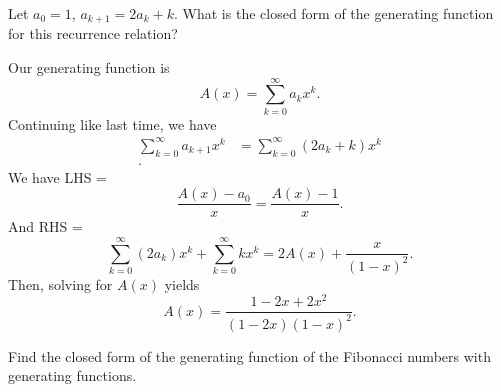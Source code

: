 \begin{eg}
	Let \( a_0=1 \), \( a_{k+1}=2a_k+k \). What is the closed form of the generating function for this recurrence relation?
\end{eg}

Our generating function is \[
	A(x) = \sum_{k=0}^{\infty}a_k x^k 
.\] Continuing like last time, we have 
\begin{align*}
	\sum_{k=0}^{\infty}a_{k+1} x^k &= \sum_{k=0}^{\infty} (2a_k+k)x^k \\
.\end{align*}
We have LHS = \[
	\frac{A(x)-a_{0}}{x} = \frac{A(x)-1}{x}
.\] And RHS =\[
	\sum_{k=0}^{\infty} (2a_k)x^k + \sum_{k=0}^{\infty}  kx^k = 2A(x) + \frac{x}{(1-x)^2}
.\] 
Then, solving for \( A(x) \) yields \[
	A(x) = \frac{1-2x+2x^2}{(1-2x)(1-x)^2}
.\] 

Find the closed form of the generating function of the Fibonacci numbers with generating functions.
